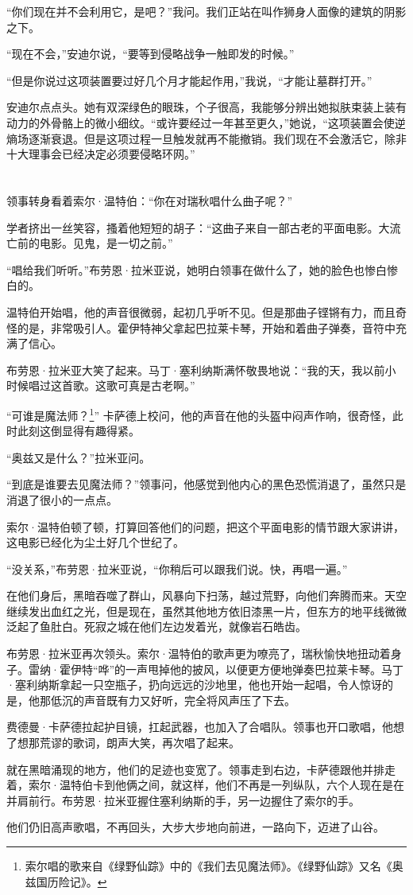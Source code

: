 \documentclass[
  b5paper, 
  10pt, 
  AutoFakeBold, 
  AutoFakeSlant
]{article}
\begin{document}
“你们现在并不会利用它，是吧？”我问。我们正站在叫作狮身人面像的建筑的阴影之下。

“现在不会，”安迪尔说，“要等到侵略战争一触即发的时候。”

“但是你说过这项装置要过好几个月才能起作用，”我说，“才能让墓群打开。”

安迪尔点点头。她有双深绿色的眼珠，个子很高，我能够分辨出她拟肤束装上装有动力的外骨骼上的微小细纹。“或许要经过一年甚至更久，”她说，“这项装置会使逆熵场逐渐衰退。但是这项过程一旦触发就再不能撤销。我们现在不会激活它，除非十大理事会已经决定必须要侵略环网。”

\section{}

领事转身看着索尔·温特伯：“你在对瑞秋唱什么曲子呢？”

学者挤出一丝笑容，搔着他短短的胡子：“这曲子来自一部古老的平面电影。大流亡前的电影。见鬼，是一切之前。”

“唱给我们听听。”布劳恩·拉米亚说，她明白领事在做什么了，她的脸色也惨白惨白的。

温特伯开始唱，他的声音很微弱，起初几乎听不见。但是那曲子铿锵有力，而且奇怪的是，非常吸引人。霍伊特神父拿起巴拉莱卡琴，开始和着曲子弹奏，音符中充满了信心。

布劳恩·拉米亚大笑了起来。马丁·塞利纳斯满怀敬畏地说：“我的天，我以前小时候唱过这首歌。这歌可真是古老啊。”

“可谁是魔法师？\footnote{索尔唱的歌来自《绿野仙踪》中的《我们去见魔法师》。《绿野仙踪》又名《奥兹国历险记》。}”
卡萨德上校问，他的声音在他的头盔中闷声作响，很奇怪，此时此刻这倒显得有趣得紧。

“奥兹又是什么？”拉米亚问。

“到底是谁要去见魔法师？”领事问，他感觉到他内心的黑色恐慌消退了，虽然只是消退了很小的一点点。

索尔·温特伯顿了顿，打算回答他们的问题，把这个平面电影的情节跟大家讲讲，这电影已经化为尘土好几个世纪了。

“没关系，”布劳恩·拉米亚说，“你稍后可以跟我们说。快，再唱一遍。”

在他们身后，黑暗吞噬了群山，风暴向下扫荡，越过荒野，向他们奔腾而来。天空继续发出血红之光，但是现在，虽然其他地方依旧漆黑一片，但东方的地平线微微泛起了鱼肚白。死寂之城在他们左边发着光，就像岩石皓齿。

布劳恩·拉米亚再次领头。索尔·温特伯的歌声更为嘹亮了，瑞秋愉快地扭动着身子。雷纳·霍伊特“哗”的一声甩掉他的披风，以便更方便地弹奏巴拉莱卡琴。马丁·塞利纳斯拿起一只空瓶子，扔向远远的沙地里，他也开始一起唱，令人惊讶的是，他那低沉的声音既有力又好听，完全将风声压了下去。

费德曼·卡萨德拉起护目镜，扛起武器，也加入了合唱队。领事也开口歌唱，他想了想那荒谬的歌词，朗声大笑，再次唱了起来。

就在黑暗涌现的地方，他们的足迹也变宽了。领事走到右边，卡萨德跟他并排走着，索尔·温特伯卡到他俩之间，就这样，他们不再是一列纵队，六个人现在是在并肩前行。布劳恩·拉米亚握住塞利纳斯的手，另一边握住了索尔的手。

他们仍旧高声歌唱，不再回头，大步大步地向前进，一路向下，迈进了山谷。

\setlength{\parskip}{0cm}
\printbibliography
\end{document}
